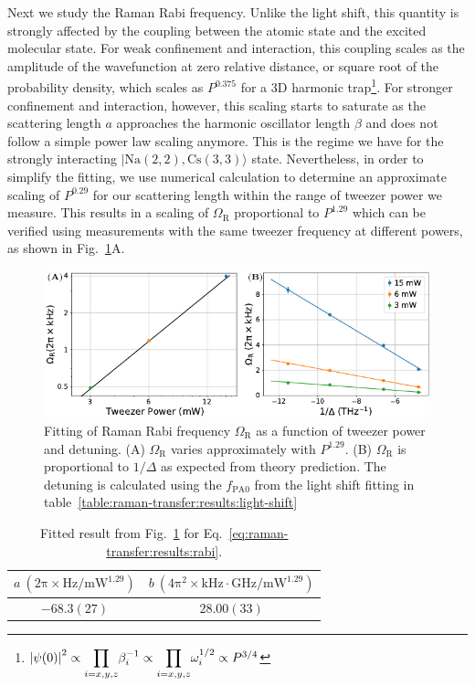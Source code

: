 Next we study the Raman Rabi frequency.
Unlike the light shift, this quantity is strongly affected by the coupling
between the atomic state and the excited molecular state.
For weak confinement and interaction,
this coupling scales as the amplitude of the wavefunction at zero relative distance,
or square root of the probability density,
which scales as $P^{0.375}$ for a 3D harmonic trap\footnote{
  ${\left|{\psi(0)}\right|}^2\propto{\displaystyle\prod_{i=x,y,z}}\beta_i^{-1}\propto{\displaystyle\prod_{i=x,y,z}}\omega_i^{1/2}\propto P^{3/4}$}.
For stronger confinement and interaction, however,
this scaling starts to saturate as the scattering length $a$ approaches
the harmonic oscillator length $\beta$ and does not follow a simple power law scaling anymore.
This is the regime we have for the strongly interacting $|\mathrm{Na(2,2),Cs(3,3)}\rangle$ state.
Nevertheless, in order to simplify the fitting,
we use numerical calculation to determine an approximate scaling of $P^{0.29}$
for our scattering length within the range of tweezer power we measure.
This results in a scaling of $\Omega_{\mathrm{R}}$ proportional to $P^{1.29}$
which can be verified using measurements with the same tweezer frequency at different powers,
as shown in Fig.~\ref{fig:raman-transfer:results:rabi}A.
\begin{figure}
  \centering
  \includegraphics[width=\textwidth]{figures/raman_transfer_scaling_rabi.pdf}
  \caption[Fitting of Raman Rabi frequencies.]{
    Fitting of Raman Rabi frequency $\Omega_{\mathrm{R}}$
    as a function of tweezer power and detuning.
    (A) $\Omega_{\mathrm{R}}$ varies approximately with $P^{1.29}$.
    (B) $\Omega_{\mathrm{R}}$ is proportional to $1/\Delta$ as expected from theory prediction.
    The detuning is calculated using the $f_{\mathrm{PA0}}$ from the light shift fitting
    in table~\ref{table:raman-transfer:results:light-shift}
    \label{fig:raman-transfer:results:rabi}}
\end{figure}
\begin{table}
  \centering
  \caption[Fitting result of Raman Rabi frequencies.]{
    Fitted result from Fig.~\ref{fig:raman-transfer:results:rabi}
    for Eq.~\ref{eq:raman-transfer:results:rabi}.
    \label{table:raman-transfer:results:rabi}}
  \begin{tabular}{|c|c|}
    \hline
    $a~(\mathrm{2\pi\times Hz/mW^{1.29}})$&$b~(\mathrm{4\pi^2\times kHz\cdot\!GHz/mW^{1.29}})$\\\hline
    $-68.3(27)$&$28.00(33)$\\\hline
  \end{tabular}
\end{table}
